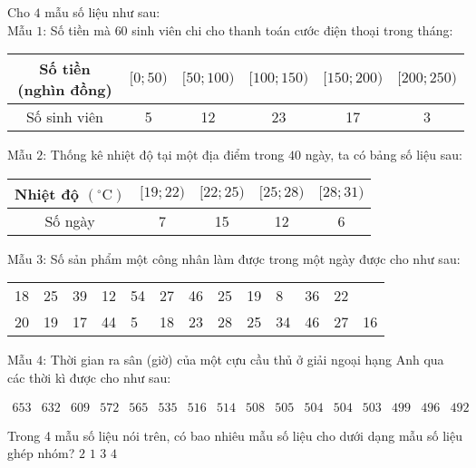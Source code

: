 \begin{ex}%
Cho $4$ mẫu số liệu như sau:\\
Mẫu $1$: Số tiền mà $60$ sinh viên chi cho thanh toán cước điện thoại trong tháng:
\begin{center}
\begin{tabular}{|c|c|c|c|c|c|}
\hline Số tiền (nghìn đồng) & {$[0 ; 50)$} & {$[50 ; 100)$} & {$[100 ; 150)$} & {$[150 ; 200)$} & {$[200 ; 250)$} \\
\hline Số sinh viên & 5 & 12 & 23 & 17 & 3 \\
\hline
\end{tabular}
\end{center}
	Mẫu $2$: Thống kê nhiệt độ tại một địa điểm trong $40$ ngày, ta có bảng số liệu sau:
\begin{center}
\begin{tabular}{|c|c|c|c|c|}
\hline Nhiệt độ $\left({ }^{\circ} \mathrm{C}\right)$ & {$[19 ; 22)$} & {$[22 ; 25)$} & {$[25 ; 28)$} & {$[28 ; 31)$} \\
\hline Số ngày & 7 & 15 & 12 & 6 \\
\hline
\end{tabular}
\end{center}
Mẫu $3$: Số sản phẩm một công nhân làm được trong một ngày được cho như sau:
\begin{center}
\begin{tabular}{lllllllllllll}
18 & 25 & 39 & 12 & 54 & 27 & 46 & 25 & 19 & 8 & 36 & 22 & \\
20 & 19 & 17 & 44 & 5 & 18 & 23 & 28 & 25 & 34 & 46 & 27 & 16
\end{tabular}
\end{center}
Mẫu $4$: Thời gian ra sân (giờ) của một cựu cầu thủ ở giải ngoại hạng Anh qua các thời kì được cho như sau:
\begin{center}$\begin{array}{llllllllllllllll}653 & 632 & 609 & 572 & 565 & 535 & 516 & 514 & 508 & 505 & 504 & 504 & 503 & 499 & 496 & 492\end{array}$\end{center}
	Trong 4 mẫu số liệu nói trên, có bao nhiêu mẫu số liệu cho dưới dạng mẫu số liệu ghép nhóm?
\choice
{\True $2$}
{$1$}
{$3$}
{$4$}
\end{ex}

